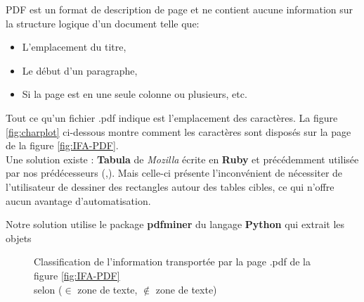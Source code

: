 	\par
	PDF est un format de description de page et ne contient aucune information sur la structure logique d'un document telle que:\begin{itemize}
	\item L'emplacement du titre,
	\item Le début d'un paragraphe,
	\item Si la page est en une seule colonne ou plusieurs, etc.
	\end{itemize}
	\par
	Tout ce qu'un fichier .pdf indique est l'emplacement des caractères. La figure \ref{fig:charplot} ci-dessous montre comment les caractères sont disposés sur la page de la figure \ref{fig:IFA-PDF}.\\Une solution existe : \textbf{Tabula} de \textit{Mozilla} écrite en \textbf{Ruby} et précédemment utilisée par nos prédécesseurs (\cite{CHEMLAL},\cite{NACER}). Mais celle-ci présente l'inconvénient de nécessiter de l'utilisateur de dessiner des rectangles autour des tables cibles, ce qui n'offre aucun avantage d'automatisation.
	\par
	Notre solution utilise le package \textbf{pdfminer}\cite{pdfminer} du langage \textbf{Python} qui extrait les objets	\begin{figure}
			\centering			    		
			\caption{Classification de l'information transportée par la page .pdf de la figure \ref{fig:IFA-PDF}\\ selon ($\in$ zone de texte, $\notin$ zone de texte)}
			\label{fig:charclass}
		\end{figure}
